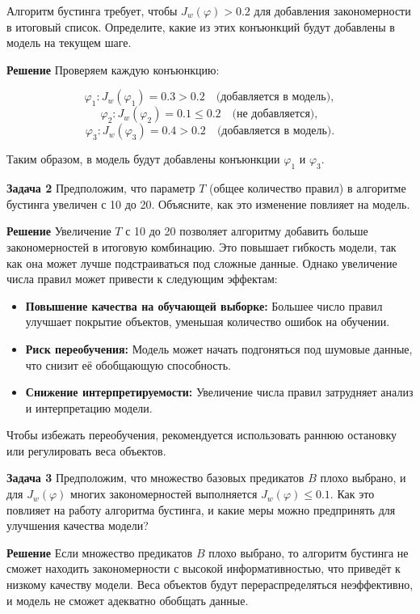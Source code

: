 \begin{itemize}
Алгоритм бустинга требует, чтобы \( J_w(\varphi) > 0.2 \) для добавления закономерности в итоговый список. Определите, какие из этих конъюнкций будут добавлены в модель на текущем шаге.  

\textbf{Решение}  
Проверяем каждую конъюнкцию:  

\[
\varphi_1: J_w(\varphi_1) = 0.3 > 0.2 \quad \text{(добавляется в модель)},
\]
\[
\varphi_2: J_w(\varphi_2) = 0.1 \leq 0.2 \quad \text{(не добавляется)},
\]
\[
\varphi_3: J_w(\varphi_3) = 0.4 > 0.2 \quad \text{(добавляется в модель)}.
\]

Таким образом, в модель будут добавлены конъюнкции \( \varphi_1 \) и \( \varphi_3 \).

\vspace{0.5cm}

\textbf{Задача 2}  
Предположим, что параметр \( T \) (общее количество правил) в алгоритме бустинга увеличен с 10 до 20. Объясните, как это изменение повлияет на модель.  

\textbf{Решение}  
Увеличение \( T \) с 10 до 20 позволяет алгоритму добавить больше закономерностей в итоговую комбинацию. Это повышает гибкость модели, так как она может лучше подстраиваться под сложные данные. Однако увеличение числа правил может привести к следующим эффектам:
\begin{itemize}
    \item \textbf{Повышение качества на обучающей выборке:} Большее число правил улучшает покрытие объектов, уменьшая количество ошибок на обучении.  
    \item \textbf{Риск переобучения:} Модель может начать подгоняться под шумовые данные, что снизит её обобщающую способность.  
    \item \textbf{Снижение интерпретируемости:} Увеличение числа правил затрудняет анализ и интерпретацию модели.
\end{itemize}

Чтобы избежать переобучения, рекомендуется использовать раннюю остановку или регулировать веса объектов.  

\vspace{0.5cm}

\textbf{Задача 3}  
Предположим, что множество базовых предикатов \( B \) плохо выбрано, и для \( J_w(\varphi) \) многих закономерностей выполняется \( J_w(\varphi) \leq 0.1 \). Как это повлияет на работу алгоритма бустинга, и какие меры можно предпринять для улучшения качества модели?  

\textbf{Решение}  
Если множество предикатов \( B \) плохо выбрано, то алгоритм бустинга не сможет находить закономерности с высокой информативностью, что приведёт к низкому качеству модели. Веса объектов будут перераспределяться неэффективно, и модель не сможет адекватно обобщать данные.  


\end{itemize}
